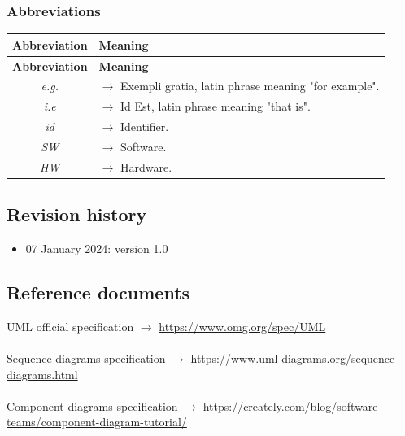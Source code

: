 \documentclass{article}
\begin{document}
{\begin{xltabular}{\textwidth}{ >{\raggedright\arraybackslash}c >{\raggedright\arraybackslash}X }
\end{xltabular}

\newpage
\subsubsection{Abbreviations}
\begin{xltabular}{\textwidth}{ >{\raggedright\arraybackslash}c >{\raggedright\arraybackslash}X }
    \hline
    \textbf{Abbreviation} & \textbf{Meaning} \\
    \hline

    \endfirsthead

    \hline
    \textbf{Abbreviation} & \textbf{Meaning} \\
    \hline

    \endhead
    \endfoot
    \endlastfoot

    \textit{e.g.} & $\rightarrow$ Exempli gratia, latin phrase meaning "for example".
    \\
    \textit{i.e} & $\rightarrow$ Id Est, latin phrase meaning "that is".
    \\
    \textit{id} & $\rightarrow$ Identifier.
    \\
    \textit{SW} & $\rightarrow$ Software.
    \\
    \textit{HW} & $\rightarrow$ Hardware.
    \\
\end{xltabular}
\subsection{Revision history}
\begin{itemize}
    \item 07 January 2024: version 1.0
\end{itemize}

\subsection{Reference documents}
UML official specification $\rightarrow$ \url{https://www.omg.org/spec/UML}
\\ \\
Sequence diagrams specification $\rightarrow$ \url{https://www.uml-diagrams.org/sequence-diagrams.html}
\\ \\
Component diagrams specification $\rightarrow$ \url{https://creately.com/blog/software-teams/component-diagram-tutorial/}

}
\end{document}
